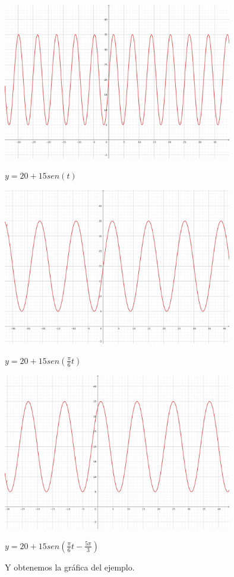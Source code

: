 \begin{center}
     \includegraphics[width=10cm]{recursos/y_Aseno.png}\par
     $ y = 20 + 15sen(t) $
\end{center}

\begin{center}
     \includegraphics[width=10cm]{recursos/y_Aseno_o.png}\par
     $ y = 20 + 15sen(\frac{\pi}{6}t) $
\end{center}

\begin{center}
     \includegraphics[width=10cm]{recursos/y_Aseno_o_phi.png}\par
     $ y = 20 + 15sen(\frac{\pi}{6}t - \frac{5\pi}{3}) $
\end{center}
\newline
\begin{center}
 Y obtenemos la gráfica del ejemplo.
\end{center}